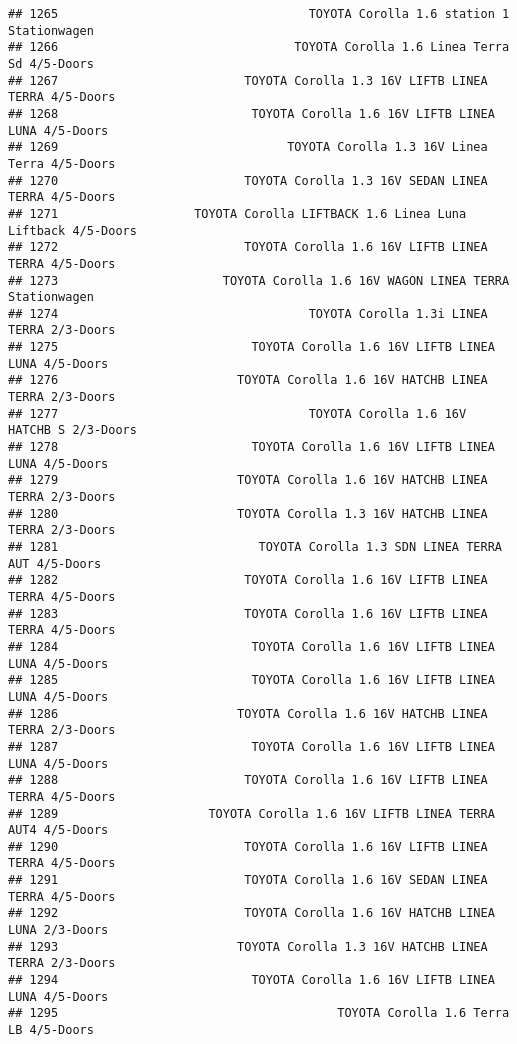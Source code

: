 \documentclass[]{article}
\begin{document}
\begin{verbatim}
## 1265                                   TOYOTA Corolla 1.6 station 1 Stationwagen
## 1266                                 TOYOTA Corolla 1.6 Linea Terra Sd 4/5-Doors
## 1267                          TOYOTA Corolla 1.3 16V LIFTB LINEA TERRA 4/5-Doors
## 1268                           TOYOTA Corolla 1.6 16V LIFTB LINEA LUNA 4/5-Doors
## 1269                                TOYOTA Corolla 1.3 16V Linea Terra 4/5-Doors
## 1270                          TOYOTA Corolla 1.3 16V SEDAN LINEA TERRA 4/5-Doors
## 1271                   TOYOTA Corolla LIFTBACK 1.6 Linea Luna Liftback 4/5-Doors
## 1272                          TOYOTA Corolla 1.6 16V LIFTB LINEA TERRA 4/5-Doors
## 1273                       TOYOTA Corolla 1.6 16V WAGON LINEA TERRA Stationwagen
## 1274                                   TOYOTA Corolla 1.3i LINEA TERRA 2/3-Doors
## 1275                           TOYOTA Corolla 1.6 16V LIFTB LINEA LUNA 4/5-Doors
## 1276                         TOYOTA Corolla 1.6 16V HATCHB LINEA TERRA 2/3-Doors
## 1277                                   TOYOTA Corolla 1.6 16V HATCHB S 2/3-Doors
## 1278                           TOYOTA Corolla 1.6 16V LIFTB LINEA LUNA 4/5-Doors
## 1279                         TOYOTA Corolla 1.6 16V HATCHB LINEA TERRA 2/3-Doors
## 1280                         TOYOTA Corolla 1.3 16V HATCHB LINEA TERRA 2/3-Doors
## 1281                            TOYOTA Corolla 1.3 SDN LINEA TERRA AUT 4/5-Doors
## 1282                          TOYOTA Corolla 1.6 16V LIFTB LINEA TERRA 4/5-Doors
## 1283                          TOYOTA Corolla 1.6 16V LIFTB LINEA TERRA 4/5-Doors
## 1284                           TOYOTA Corolla 1.6 16V LIFTB LINEA LUNA 4/5-Doors
## 1285                           TOYOTA Corolla 1.6 16V LIFTB LINEA LUNA 4/5-Doors
## 1286                         TOYOTA Corolla 1.6 16V HATCHB LINEA TERRA 2/3-Doors
## 1287                           TOYOTA Corolla 1.6 16V LIFTB LINEA LUNA 4/5-Doors
## 1288                          TOYOTA Corolla 1.6 16V LIFTB LINEA TERRA 4/5-Doors
## 1289                     TOYOTA Corolla 1.6 16V LIFTB LINEA TERRA AUT4 4/5-Doors
## 1290                          TOYOTA Corolla 1.6 16V LIFTB LINEA TERRA 4/5-Doors
## 1291                          TOYOTA Corolla 1.6 16V SEDAN LINEA TERRA 4/5-Doors
## 1292                          TOYOTA Corolla 1.6 16V HATCHB LINEA LUNA 2/3-Doors
## 1293                         TOYOTA Corolla 1.3 16V HATCHB LINEA TERRA 2/3-Doors
## 1294                           TOYOTA Corolla 1.6 16V LIFTB LINEA LUNA 4/5-Doors
## 1295                                       TOYOTA Corolla 1.6 Terra LB 4/5-Doors

\end{verbatim}
\end{document}
